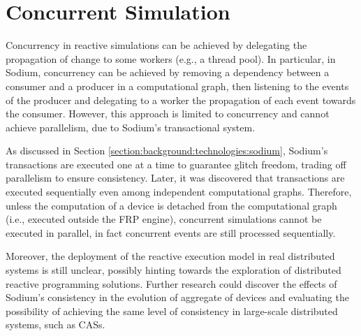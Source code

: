 
\section{Concurrent Simulation}
\label{section:design:concurrent-simulation}

Concurrency in reactive simulations can be achieved by delegating the
propagation of change to some workers (e.g., a thread pool). In particular, in
Sodium, concurrency can be achieved by removing a dependency between a consumer
and a producer in a computational graph, then listening to the events of the
producer and delegating to a worker the propagation of each event towards the
consumer. However, this approach is limited to concurrency and cannot achieve
parallelism, due to Sodium's transactional system.

As discussed in Section \ref{section:background:technologies:sodium}, Sodium's
transactions are executed one at a time to guarantee glitch freedom, trading
off parallelism to ensure consistency. Later, it was discovered that
transactions are executed sequentially even among independent computational
graphs. Therefore, unless the computation of a device is detached from the
computational graph (i.e., executed outside the FRP engine), concurrent
simulations cannot be executed in parallel, in fact concurrent events are still
processed sequentially.

Moreover, the deployment of the reactive execution model in real distributed
systems is still unclear, possibly hinting towards the exploration of
distributed reactive programming solutions. Further research could discover the
effects of Sodium's consistency in the evolution of aggregate of devices and
evaluating the possibility of achieving the same level of consistency in
large-scale distributed systems, such as \ac{CAS}s.
